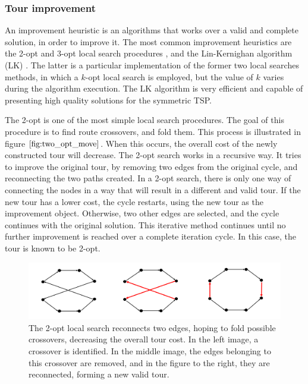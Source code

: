 \subsubsection{Tour improvement}

An improvement heuristic is an algorithms that works over a valid and complete solution, in order to improve it. The most common improvement heuristics are the 2-opt and 3-opt local search procedures \cite{lkh_original}, and the Lin-Kernighan algorithm (LK) . The latter is a particular implementation of the former two local searches methods, in which a $k$-opt local search is employed, but the value of $k$ varies during the algorithm execution. The LK algorithm is very efficient and capable of presenting high quality solutions for the symmetric TSP.

The 2-opt is one of the most simple local search procedures. The goal of this procedure is to find route crossovers, and fold them. This process is illustrated in figure $\ref{fig:two_opt_move}$. When this occurs, the overall cost of the newly constructed tour will decrease. The 2-opt search works in a recursive way. It tries to improve the original tour, by removing two edges from the original cycle, and reconnecting the two paths created. In a 2-opt search, there is only one way of connecting the nodes in a way that will result in a different and valid tour. If the new tour has a lower cost, the cycle restarts, using the new tour as the improvement object. Otherwise, two other edges are selected, and the cycle continues with the original solution. This iterative method continues until no further improvement is reached over a complete iteration cycle. In this case, the tour is known to be 2-opt.

\begin{figure}[htpb]
  \centering
  \includegraphics[width=.7\textwidth]{./Figures/tsp/2-opt-explained}
  \caption{The 2-opt local search reconnects two edges, hoping to
  fold possible crossovers, decreasing the overall tour cost. In the left image,
  a crossover is identified. In the middle image, the edges belonging to this crossover
  are removed, and in the figure to the right, they are reconnected, forming a new valid tour.}
  \label{fig:two_opt_move}
\end{figure}

